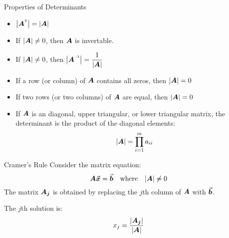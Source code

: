 \documentclass{beamer}
\begin{document}
\begin{frame}
\begin{block}{Properties of Determinants}
\begin{itemize}[<+- | alert@+>]
\item $\abs{\transposeof{\mat{A}}}=\abs{\mat{A}}$
\item If ${\left\lvert \boldsymbol{A}\right\rvert}\neq 0$, then $\boldsymbol{A}$ is invertable.
\item If ${\left\lvert \boldsymbol{A}\right\rvert}\neq 0$, then $\abs{\inverseof{\mat{A}}}=\dfrac{1}{\abs{\mat{A}}}$
\item If a row (or column) of $\boldsymbol{A}$ contains all zeros, then ${\left\lvert \boldsymbol{A}\right\rvert}=0$
\item If two rows (or two columns) of $\boldsymbol{A}$ are equal, then ${\left\lvert \boldsymbol{A}\right\rvert}=0$
\item If $\boldsymbol{A}$ is an diagonal, upper triangular, or lower triangular matrix, the determinant is the product of the diagonal elements:
\begin{equation*}
{\left\lvert \boldsymbol{A}\right\rvert}=\prod_{i=1}^{m} a_{ii}
\end{equation*}
\end{itemize}
\end{block}
\end{frame}

\begin{frame}
\begin{block}{Cramer's Rule}
Consider the matrix equation:
\begin{equation*}
\boldsymbol{A}{\vec{\boldsymbol{x}}}={\vec{\boldsymbol{b}}}\quad \text{where}\quad{\left\lvert \boldsymbol{A}\right\rvert}\neq0
\end{equation*}
The matrix $\boldsymbol{A_j}$ is obtained by replacing the $j$th column of $\boldsymbol{A}$ with ${\vec{\boldsymbol{b}}}$. 

\vspace{2mm}
The $j$th solution is:
\begin{equation*}
x_j = \dfrac{{\left\lvert \boldsymbol{A_j}\right\rvert}}{{\left\lvert \boldsymbol{A}\right\rvert}}
\end{equation*}
\end{block}
\end{frame}
\end{document}
